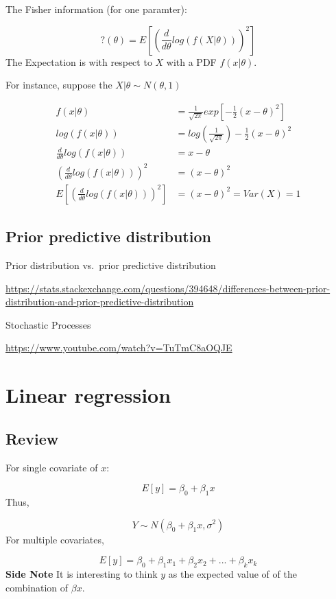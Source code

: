 \documentclass[]{book}
\begin{document}
The Fisher information (for one paramter):

\[?(\theta)=E[(\frac{d}{d\theta} log(f(X|\theta)))^2]\] The Expectation
is with respect to \(X\) with a PDF \(f(x|\theta)\).

For instance, suppose the \(X|\theta \sim N(\theta,1)\)

\[\begin{aligned} f(x|\theta) &=\frac{1}{\sqrt{2 \pi}} exp[-\frac{1}{2}(x-\theta)^2] \\ log(f(x|\theta)) &= log(\frac{1}{\sqrt{2 \pi}})-\frac{1}{2}(x-\theta)^2 \\ \frac{d}{d\theta}log(f(x|\theta)) &=x-\theta \\ (\frac{d}{d\theta}log(f(x|\theta)))^2 &=(x-\theta)^2 \\E[(\frac{d}{d\theta}log(f(x|\theta)))^2]&=(x-\theta)^2=Var(X)=1 \end{aligned}\]

\subsection{Prior predictive
distribution}\label{prior-predictive-distribution}

Prior distribution vs.~prior predictive distribution

\url{https://stats.stackexchange.com/questions/394648/differences-between-prior-distribution-and-prior-predictive-distribution}

Stochastic Processes

\url{https://www.youtube.com/watch?v=TuTmC8aOQJE}

\section{Linear regression}\label{linear-regression}

\subsection{Review}\label{review}

For single covariate of \(x\):

\[E[y]=\beta_0+\beta_1 x\] Thus,

\[Y \sim N(\beta_0+\beta_1 x, \sigma^2)\] For multiple covariates,

\[E[y]=\beta_0+\beta_1 x_1+\beta_2 x_2 + ...+ \beta_kx_k\] \textbf{Side
Note} It is interesting to think \(y\) as the expected value of of the
combination of \(\beta x\).
\end{document}
